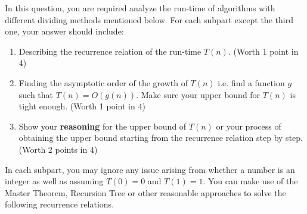
In this question, you are required analyze the run-time of algorithms with different dividing methods mentioned below. For each subpart except the third one, your answer should include:
\begin{enumerate}
    \item Describing the recurrence relation of the run-time $T(n)$. (Worth 1 point in 4)
    \item Finding the asymptotic order of the growth of $T(n)$ i.e. find a function $g$ such that $T(n) = O(g(n))$. Make sure your upper bound for $T(n)$ is tight enough. (Worth 1 point in 4)
    \item Show your \textbf{reasoning} for the upper bound of $T(n)$ or your process of obtaining the upper bound starting from the recurrence relation step by step. (Worth 2 points in 4)
\end{enumerate}

In each subpart, you may ignore any issue arising from whether a number is an integer as well as assuming \(T(0) = 0\) and \(T(1) = 1\). You can make use of the Master Theorem, Recursion Tree or other reasonable approaches to solve the following recurrence relations.

